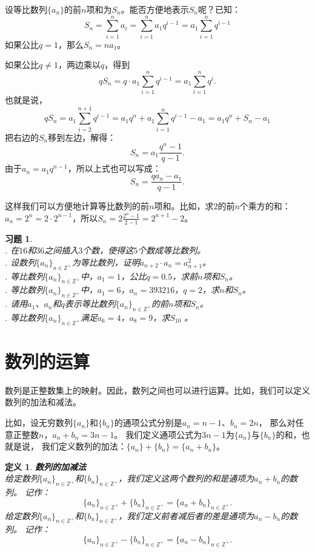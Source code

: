 \documentclass[12pt,UTF8]{ctexbook}
\newtheorem{df}{定义}[section]
\newtheorem{xt}{习题}[section]
\begin{document}
设等比数列$\{a_n\}$的前$n$项和为$S_n$。能否方便地表示$S_n$呢？已知：
$$ S_n = \sum_{i=1}^n a_i = \sum_{i=1}^n a_1 q^{i-1} = a_1 \sum_{i=1}^n q^{i-1} $$
如果公比$q = 1$，那么$S_n = na_1$。

如果公比$q \neq 1$，两边乘以$q$，得到
$$ q S_n = q \cdot a_1 \sum_{i=1}^n q^{i-1} = a_1 \sum_{i=1}^n q^{i}.$$
也就是说，
$$ qS_n = a_1 \sum_{i=2}^{n+1} q^{i-1} = a_1 q^n + a_1 \sum_{i=1}^{n} q^{i-1} - a_1  = a_1 q^n + S_{n} - a_1$$
把右边的$S_n$移到左边，解得：
$$ S_n = a_1\frac{q^n - 1}{q - 1}. $$
由于$a_n = a_1q^{n-1}$，所以上式也可以写成：
$$ S_n = \frac{q a_n - a_1}{q - 1}. $$

这样我们可以方便地计算等比数列的前$n$项和。比如，求$2$的前$n$个乘方的和：$a_n = 2^{n} = 2\cdot 2^{n-1}$，所以$S_n =2\frac{2^{n}-1}{2-1} = 2^{n+1} - 2$。
\begin{xt}
    \mbox{} \\
    . 在$16$和$36$之间插入$3$个数，使得这$5$个数成等比数列。 \\
    . 设数列$\{a_n\}_{n\in\mathbb{Z}^+}$为等比数列，证明$a_{n+2} \cdot a_n = a_{n+1}^2$。 \\
    . 等比数列$\{a_n\}_{n\in\mathbb{Z}^+}$中，$a_1 = 1$，公比$q = 0.5$，求前$n$项和$S_n$。 \\
    . 等比数列$\{a_n\}_{n\in\mathbb{Z}^+}$中，$a_1 = 6$，$a_n = 393216$，$q = 2$，求$n$和$S_n$。 \\
    . 请用$a_1$、$a_n$和$q$表示等比数列$\{a_n\}_{n\in\mathbb{Z}^+}$的前$n$项和$S_n$。 \\
    . 等比数列$\{a_n\}_{n\in\mathbb{Z}^+}$满足$a_6 = 4$，$a_{8}=9$，求$S_{10}$ 。
\end{xt}

\section{数列的运算}

数列是正整数集上的映射。因此，数列之间也可以进行运算。比如，我们可以定义数列的加法和减法。

比如，设无穷数列$\{a_n\}$和$\{b_n\}$的通项公式分别是$a_n = n - 1$、$b_n = 2n$，
那么对任意正整数$n$，$a_n + b_n = 3n - 1$。
我们定义通项公式为$3n - 1$为$\{a_n\}$与$\{b_n\}$的和，也就是说，
我们定义数列的加法：$\{a_n\} + \{b_n\} = \{a_n + b_n\}$。

\begin{df}\textbf{数列的加减法}\\
    给定数列$\{a_n\}_{n\in\mathbb{Z}^+}$和$\{b_n\}_{n\in\mathbb{Z}^+}$，我们定义这两个数列的和是通项为$a_n + b_n$的数列。
    记作：
    $$ \{a_n\}_{n\in\mathbb{Z}^+} + \{b_n\}_{n\in\mathbb{Z}^+} = \{a_n + b_n\}_{n\in\mathbb{Z}^+}.$$
    给定数列$\{a_n\}_{n\in\mathbb{Z}^+}$和$\{b_n\}_{n\in\mathbb{Z}^+}$，我们定义前者减后者的差是通项为$a_n - b_n$的数列。
    记作：
    $$ \{a_n\}_{n\in\mathbb{Z}^+} - \{b_n\}_{n\in\mathbb{Z}^+} = \{a_n - b_n\}_{n\in\mathbb{Z}^+}.$$    
\end{df}
\end{document}
